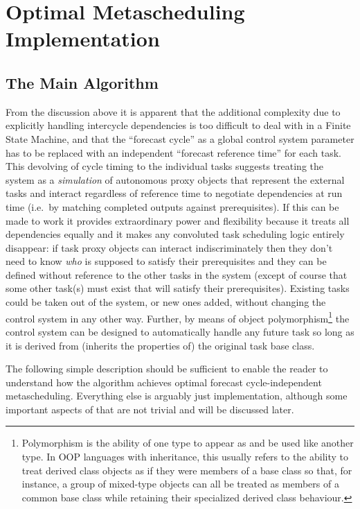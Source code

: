 \documentclass[11pt,a4paper]{article}
\begin{document}
\section{Optimal Metascheduling Implementation}

\subsection{The Main Algorithm}

From the discussion above it is apparent that the additional complexity
due to explicitly handling intercycle dependencies is too difficult to
deal with in a Finite State Machine, and that the ``forecast cycle'' as
a global control system parameter has to be replaced with an independent
``forecast reference time'' for each task. This devolving of cycle
timing to the individual tasks suggests treating the system as a {\em
simulation} of autonomous proxy objects that represent the external
tasks and interact regardless of reference time to negotiate
dependencies at run time (i.e.\ by matching completed outputs against
prerequisites). If this can be made to work it provides extraordinary
power and flexibility because it treats all dependencies equally and it
makes any convoluted task scheduling logic entirely disappear: if task
proxy objects can interact indiscriminately then they don't need to know
{\em who} is supposed to satisfy their prerequisites and they can be
defined without reference to the other tasks in the system (except of
course that some other task(s) must exist that will satisfy their
prerequisites).  Existing tasks could be taken out of the system, or new
ones added, without changing the control system in any other way.
Further, by means of object polymorphism\footnote{Polymorphism is the
ability of one type to appear as and be used like another type. In OOP
languages with inheritance, this usually refers to the ability to treat
derived class objects as if they were members of a base class so that,
for instance, a group of mixed-type objects can all be treated as
members of a common base class while retaining their specialized derived
class behaviour.} the control system can be designed to automatically
handle any future task so long as it is derived from (inherits the
properties of) the original task base class.

The following simple description should be sufficient to enable the
reader to understand how the algorithm achieves optimal forecast
cycle-independent metascheduling. Everything else is arguably just
implementation, although some important aspects of that are not trivial
and will be discussed later.
\end{document}
